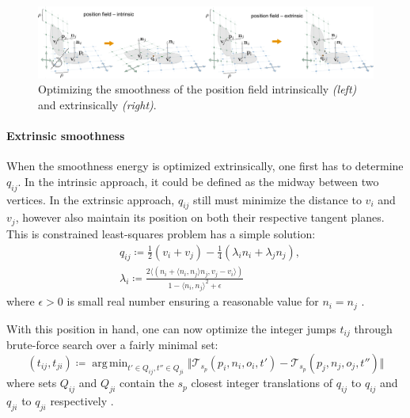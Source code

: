 \documentclass{ACGSeminar}
\DeclareMathOperator*{\argmin}{arg\,min}
\begin{document}
\begin{figure}[htb!]
	\begin{centering}
		\includegraphics[width=\textwidth]{img/position-field-intrinsic-extrinsic-horizontal.png}\par
	\end{centering}
	\caption{Optimizing the smoothness of the position field intrinsically \textit{(left)} and extrinsically \textit{(right)}. \cite{jakob2015instant}}
	\label{fig:position-field-intrinsic-extrinsic}
\end{figure}

\paragraph{Extrinsic smoothness}
When the smoothness energy is optimized extrinsically, one first has to determine $q_{ij}$. In the intrinsic approach, it could be defined as the midway between two vertices. In the extrinsic approach, $q_{ij}$ still must minimize the distance to $v_i$ and $v_j$, however also maintain its position on both their respective tangent planes. This is constrained least-squares problem has a simple solution:
\begin{equation*}
\begin{split}
	& q_{ij} \coloneqq \frac{1}{2}(v_i + v_j) - \frac{1}{4}(\lambda_i n_i + \lambda_j n_j),\\
	& \lambda_i \coloneqq \frac{2 \langle (n_i + \langle n_i, n_j \rangle n_j, v_j - v_i \rangle)}{1 - \langle n_i, n_j \rangle ^2 + \epsilon}
\end{split}
\end{equation*}
where $\epsilon > 0$ is small real number ensuring a reasonable value for $n_i = n_j$ \cite{jakob2015instant}.\bigskip

With this position in hand, one can now optimize the integer jumps $t_{ij}$ through brute-force search over a fairly minimal set:
\begin{equation*}
	(t_{ij}, t_{ji}) \coloneqq \argmin_{t' \in Q_{ij}, t'' \in Q_{ji}} \Vert \mathcal{T}_{s_p}(p_i, n_i, o_i, t') - \mathcal{T}_{s_p}(p_j, n_j, o_j, t'') \Vert
\end{equation*}
where sets $Q_{ij}$ and $Q_{ji}$ contain the $s_p$ closest integer translations of $q_{ij}$ to $q_{ij}$ and $q_{ji}$ to $q_{ji}$ respectively \cite{jakob2015instant}.\bigskip
\end{document}
